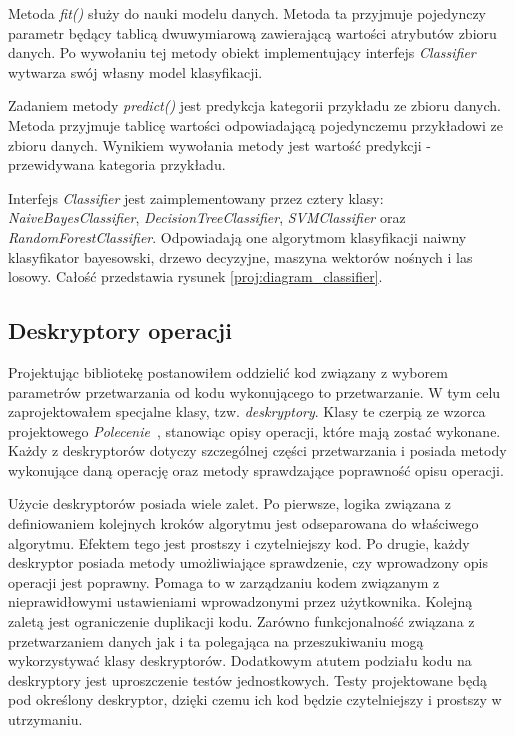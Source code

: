 \documentclass[../thesis.tex]{subfiles}
\begin{document}
Metoda \emph{fit()} służy do nauki modelu danych. Metoda ta przyjmuje pojedynczy parametr będący tablicą dwuwymiarową zawierającą wartości atrybutów zbioru danych. Po wywołaniu tej metody obiekt implementujący interfejs \emph{Classifier} wytwarza swój własny model klasyfikacji.

Zadaniem metody \emph{predict()} jest predykcja kategorii przykładu ze zbioru danych. Metoda przyjmuje tablicę wartości odpowiadającą pojedynczemu przykładowi ze zbioru danych. Wynikiem wywołania metody jest wartość predykcji - przewidywana kategoria przykładu.

Interfejs \emph{Classifier} jest zaimplementowany przez cztery klasy: \emph{NaiveBayesClassifier}, \emph{DecisionTreeClassifier}, \emph{SVMClassifier} oraz \emph{RandomForestClassifier}. Odpowiadają one algorytmom klasyfikacji naiwny klasyfikator bayesowski, drzewo decyzyjne, maszyna wektorów nośnych i las losowy. Całość przedstawia rysunek \ref{proj:diagram_classifier}.

\subsection{Deskryptory operacji}
\label{proj:descriptors}

Projektując bibliotekę postanowiłem oddzielić kod związany z wyborem parametrów przetwarzania od kodu wykonującego to przetwarzanie. W tym celu zaprojektowałem specjalne klasy, tzw. \emph{deskryptory}. Klasy te czerpią ze wzorca projektowego \emph{Polecenie}~\cite{gang_of_four}, stanowiąc opisy operacji, które mają zostać wykonane. Każdy z deskryptorów dotyczy szczególnej części przetwarzania i posiada metody wykonujące daną operację oraz metody sprawdzające poprawność opisu operacji.

Użycie deskryptorów posiada wiele zalet. Po pierwsze, logika związana z definiowaniem kolejnych kroków algorytmu jest odseparowana do właściwego algorytmu. Efektem tego jest prostszy i czytelniejszy kod. Po drugie, każdy deskryptor posiada metody umożliwiające sprawdzenie, czy wprowadzony opis operacji jest poprawny. Pomaga to w zarządzaniu kodem związanym z nieprawidłowymi ustawieniami wprowadzonymi przez użytkownika. Kolejną zaletą jest ograniczenie duplikacji kodu. Zarówno funkcjonalność związana z przetwarzaniem danych jak i ta polegająca na przeszukiwaniu mogą wykorzystywać klasy deskryptorów. Dodatkowym atutem podziału kodu na deskryptory jest uproszczenie testów jednostkowych. Testy projektowane będą pod określony deskryptor, dzięki czemu ich kod będzie czytelniejszy i prostszy w utrzymaniu.
\end{document}
